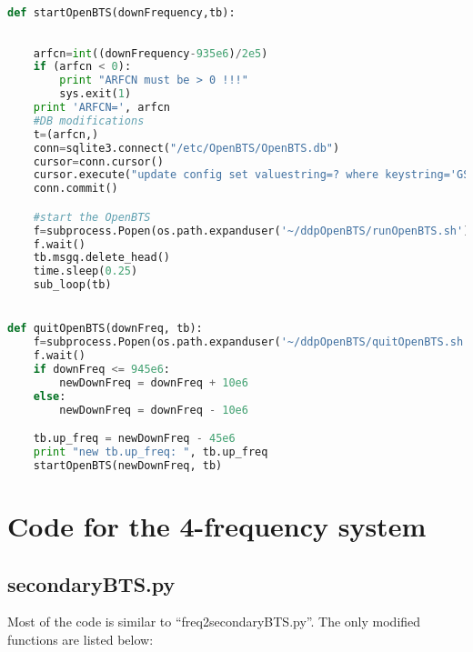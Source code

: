 \begin{lstlisting}[language=Python]
                
def startOpenBTS(downFrequency,tb):
    
    
    arfcn=int((downFrequency-935e6)/2e5)
    if (arfcn < 0):
        print "ARFCN must be > 0 !!!"
        sys.exit(1)
    print 'ARFCN=', arfcn
    #DB modifications
    t=(arfcn,)
    conn=sqlite3.connect("/etc/OpenBTS/OpenBTS.db")
    cursor=conn.cursor()
    cursor.execute("update config set valuestring=? where keystring='GSM.Radio.C0'",t)
    conn.commit()

    #start the OpenBTS
    f=subprocess.Popen(os.path.expanduser('~/ddpOpenBTS/runOpenBTS.sh'))
    f.wait()
    tb.msgq.delete_head()
    time.sleep(0.25)
    sub_loop(tb)


def quitOpenBTS(downFreq, tb):
    f=subprocess.Popen(os.path.expanduser('~/ddpOpenBTS/quitOpenBTS.sh'))
    f.wait()
    if downFreq <= 945e6:
        newDownFreq = downFreq + 10e6
    else:
        newDownFreq = downFreq - 10e6

    tb.up_freq = newDownFreq - 45e6
    print "new tb.up_freq: ", tb.up_freq
    startOpenBTS(newDownFreq, tb)
\end{lstlisting}






\section{Code for the 4-frequency system}
\subsection{secondaryBTS.py}

Most of the code is similar to ``freq2secondaryBTS.py''. The only modified 
functions are listed below:

